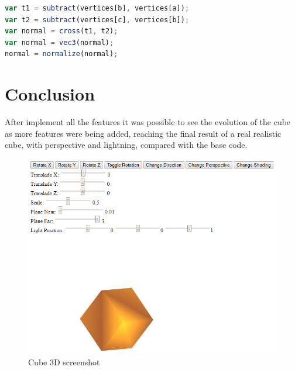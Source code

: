 \documentclass{article}
\begin{document}
\begin{lstlisting}[language=JavaScript]
var t1 = subtract(vertices[b], vertices[a]);
var t2 = subtract(vertices[c], vertices[b]);
var normal = cross(t1, t2);
var normal = vec3(normal);
normal = normalize(normal);
\end{lstlisting}

\section{Conclusion}
After implement all the features it was possible to see the evolution of the cube as more features were being added, reaching the final result of a real realistic cube, with perspective and lightning, compared with the base code.

\begin{figure}[!ht]
\centering
\includegraphics[scale=0.50]{cube3d}
\caption{Cube 3D screenshot}
\label{fig:fig1}
\end{figure}
\end{document}
